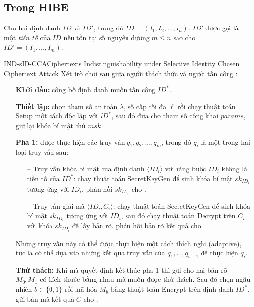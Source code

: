 \documentclass[class=report, crop=false]{standalone}
\begin{document}
		\subsection{Trong HIBE}
			\begin{definition}
				Cho hai định danh $ID$ và $ID'$, trong đó $ID = (I_1, I_2, ..., I_n)$. $ID'$ được gọi là một \textit{tiền tố} của $ID$ nếu tồn tại số nguyên dương $m \leq n$ sao cho $ID' = (I_1, ..., I_m)$.
			\end{definition}
			\begin{game}{IND-sID-CCA}{Ciphertexts Indistinguishability under Selective Identity Chosen Ciphertext Attack}
				Xét trò chơi sau giữa người thách thức \challenger và người tấn công \adversary:
				\vspace{-1.8\baselineskip}
				\begin{itemize}[leftmargin=1.5cm, itemindent=-0.5cm]
					\item[] \textbf{Khởi đầu:} \adversary công bố định danh muốn tấn công $ID^*$.
					\item[] \textbf{Thiết lập:} \challenger chọn tham số an toàn $\lambda$, số cấp tối đa $\ell$ rồi chạy thuật toán \textsf{Setup} một cách độc lập với $ID^*$, sau đó đưa cho \adversary tham số công khai $params$, giữ lại khóa bí mật chủ $msk$.
					\item[] \textbf{Pha 1:} \adversary được thực hiện các truy vấn $q_1, q_2, ..., q_m$, trong đó $q_i$ là một trong hai loại truy vấn sau:
					\begin{itemize}
						\item[--] Truy vấn khóa bí mật của định danh $\langle ID_i \rangle$ với ràng buộc $ID_i$ không là tiền tố của $ID^*$: \challenger chạy thuật toán \textsf{SecretKeyGen} để sinh khóa bí mật $sk_{ID_i}$ tương ứng với $ID_i$. \challenger phản hồi $sk_{ID_i}$ cho \adversary .
						\item[--] Truy vấn giải mã $\langle ID_i, C_i \rangle$: \challenger chạy thuật toán \textsf{SecretKeyGen} để sinh khóa bí mật $sk_{ID_i}$ tương ứng với $ID_i$, sau đó chạy thuật toán \textsf{Decrypt} trên $C_i$ với khóa $sk_{ID_i}$ để lấy bản rõ. \challenger phản hồi bản rõ kết quả cho \adversary .
					\end{itemize}
					Những truy vấn này có thể được thực hiện một cách thích nghi (adaptive), tức là \adversary có thể dựa vào những kết quả truy vấn của $q_1, ..., q_{i - 1}$ để thực hiện $q_i$.
					\item[] \textbf{Thử thách:} Khi mà \adversary quyết định kết thúc pha 1 thì \adversary gửi cho \challenger hai bản rõ $M_0, M_1$ có kích thước bằng nhau mà \adversary muốn được thử thách. Sau đó \challenger chọn ngẫu nhiên $b \in \{0, 1\}$ rồi mã hóa $M_b$ bằng thuật toán \textsf{Encrypt} trên định danh $ID^*$. \challenger gửi bản mã kết quả $C$ cho \adversary.

\end{itemize}
\end{game}
\end{document}
